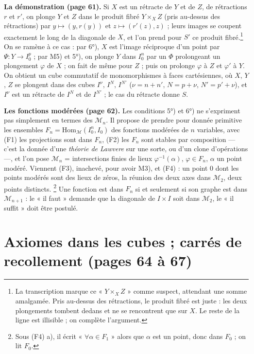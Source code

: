 \documentclass[11pt,a4paper]{article}
\begin{document}
\textbf{La démonstration (page 61).} Si $X$ est un rétracte de $Y$ et de $Z$, de
rétractions $r$ et $r'$, on plonge $Y$ et $Z$ dans le produit fibré $Y
\times_X Z$ (pris au-dessus des rétractions) par $y \mapsto (y, r(y))$ et
$z \mapsto (r'(z), z)$ ; leurs images se coupent exactement le long de la
diagonale de $X$, et l'on prend pour $S'$ ce produit fibré.\footnote{La
transcription marque ce « $Y \times_X Z$ » comme suspect, attendant une somme
amalgamée. Pris au-dessus des rétractions, le produit fibré est juste : les deux
plongements tombent dedans et ne se rencontrent que sur $X$. Le reste de la
ligne est illisible ; on complète l'argument.} On se ramène à ce cas : par
6°), $X$ est l'image réciproque d'un point par $\Psi : Y \to I_0^p$ ; par M5)
et 5°), on plonge $Y$ dans $I_0^n$ par un $\Phi$ prolongeant un plongement
$\varphi$ de $X$ ; on fait de même pour $Z$ ; puis on prolonge $\varphi$ à $Z$
et $\varphi'$ à $Y$. On obtient un cube commutatif de monomorphismes à faces
cartésiennes, où $X$, $Y$, $Z$ se plongent dans des cubes $I^\nu$, $I^N$,
$I^{N'}$ ($\nu = n + n'$, $N = p + \nu$, $N' = p' + \nu$), et $I^\nu$ est un
rétracte de $I^N$ et de $I^{N'}$ ; le cas du rétracte donne $S$.

\textbf{Les fonctions modérées (page 62).} Les conditions 5°) et 6°) ne
s'expriment pas simplement en termes des $\mathcal{M}_n$. Il propose de prendre
pour donnée primitive les ensembles $F_n = \mathrm{Hom}_{\mathcal{M}}(I_0^n,
I_0)$ des fonctions modérées de $n$ variables, avec (F1) les projections sont
dans $F_n$, (F2) les $F_n$ sont stables par composition — c'est la donnée d'une
\emph{théorie de Lawvere} sur une sorte, ou d'un clone d'opérations —, et l'on
pose $\mathcal{M}_n$ = intersections finies de lieux $\varphi^{-1}(\alpha)$,
$\varphi \in F_n$, $\alpha$ un point modéré. Viennent (F3), inachevé, pour
avoir M3), et (F4) : un point $0$ dont les points modérés sont des lieux de
zéros, la réunion des deux axes dans $\mathcal{M}_2$, deux points distincts.
\footnote{Sous (F4) a), il écrit « $\forall \alpha \in F_1$ » alors que
$\alpha$ est un point, donc dans $F_0$ ; on lit $F_0$.} Une fonction est dans
$F_n$ si et seulement si son graphe est dans $\mathcal{M}_{n+1}$ : le « il
faut » demande que la diagonale de $I \times I$ soit dans $\mathcal{M}_2$, le
« il suffit » doit être postulé.

\section*{Axiomes dans les cubes ; carrés de recollement (pages 64 à 67)}
\end{document}
